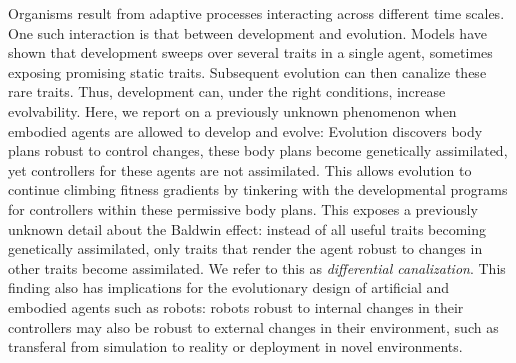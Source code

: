 %
\noindent
Organisms result from adaptive processes interacting across different time scales. 
One such interaction is that between development and evolution. 
Models have shown that development sweeps over several traits in a single agent, sometimes exposing promising static traits. 
Subsequent evolution can then canalize these rare traits. 
Thus, development can, under the right conditions, increase evolvability. 
Here, we report on a previously unknown phenomenon when embodied agents are allowed to develop and evolve: Evolution discovers body plans robust to control changes, these body plans become genetically assimilated, yet controllers for these agents are not assimilated. 
This allows evolution to continue climbing fitness gradients by tinkering with the developmental programs for controllers within these permissive body plans. 
This exposes a previously unknown detail about the Baldwin effect: instead of all useful traits becoming genetically assimilated, only traits that render the agent robust to changes in other traits become assimilated. 
We refer to this as \textit{differential canalization}.
This finding also has implications for the evolutionary design of artificial and embodied agents such as robots: robots robust to internal changes in their controllers may also be robust to external changes in their environment, such as transferal from simulation to reality or deployment in novel environments.



